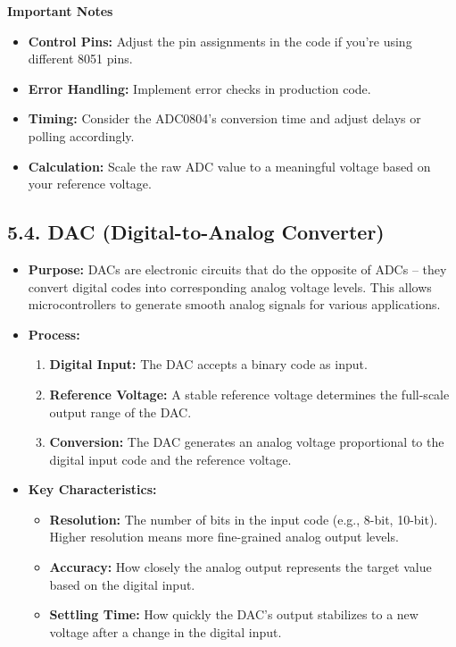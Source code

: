 \documentclass[
]{article}
\begin{document}
\textbf{Important Notes}

\begin{itemize}
\item
  \textbf{Control Pins:} Adjust the pin assignments in the code if
  you're using different 8051 pins.
\item
  \textbf{Error Handling:} Implement error checks in production code.
\item
  \textbf{Timing:} Consider the ADC0804's conversion time and adjust
  delays or polling accordingly.
\item
  \textbf{Calculation:} Scale the raw ADC value to a meaningful voltage
  based on your reference voltage.
\end{itemize}

\hypertarget{54-dac-digital-to-analog-converter}{%
\subsection{5.4. DAC (Digital-to-Analog
Converter)}\label{54-dac-digital-to-analog-converter}}

\begin{itemize}
\item
  \textbf{Purpose:} DACs are electronic circuits that do the opposite of
  ADCs -- they convert digital codes into corresponding analog voltage
  levels. This allows microcontrollers to generate smooth analog signals
  for various applications.
\item
  \textbf{Process:}

  \begin{enumerate}
  \def\labelenumi{\arabic{enumi}.}
  \item
    \textbf{Digital Input:} The DAC accepts a binary code as input.
  \item
    \textbf{Reference Voltage:} A stable reference voltage determines
    the full-scale output range of the DAC.
  \item
    \textbf{Conversion:} The DAC generates an analog voltage
    proportional to the digital input code and the reference voltage.
  \end{enumerate}
\item
  \textbf{Key Characteristics:}

  \begin{itemize}
  \item
    \textbf{Resolution:} The number of bits in the input code (e.g.,
    8-bit, 10-bit). Higher resolution means more fine-grained analog
    output levels.
  \item
    \textbf{Accuracy:} How closely the analog output represents the
    target value based on the digital input.
  \item
    \textbf{Settling Time:} How quickly the DAC's output stabilizes to a
    new voltage after a change in the digital input.
  \end{itemize}
\end{itemize}
\end{document}
